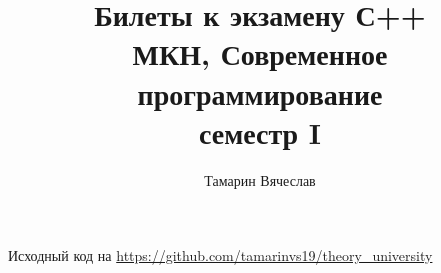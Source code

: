 \documentclass[11pt,dvipsnames]{report}
\title{Билеты к экзамену С++ \\ 
    МКН, Современное программирование \\
     семестр I
 }
\author{Тамарин Вячеслав}
\date{\displaydate{date}}
\begin{document}
\maketitle
\tableofcontents

\hspace{1em}
\begin{center}
	Исходный код на \url{https://github.com/tamarinvs19/theory_university}
\end{center}

%  
\newpage  
\newpage  
\newpage  
\newpage  
\newpage  
\newpage  
\newpage  
\newpage  
\newpage  
\newpage  
\newpage  
\newpage  
\newpage  
\newpage  
\newpage  
\newpage  
\newpage  
\newpage  
\newpage  
\end{document}
